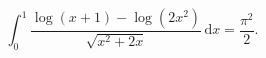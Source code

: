 %

\begin{problem}[pytanie 4568778]
    \label{stack_4568778}%
    \begin{equation}
        \int_0^1 \frac{\log (x+1) - \log(2x^2)}{\sqrt{x^2 + 2x}}\,\mathrm{d}x = \frac{\pi^2}{2}.
    \end{equation}
\end{problem}

%